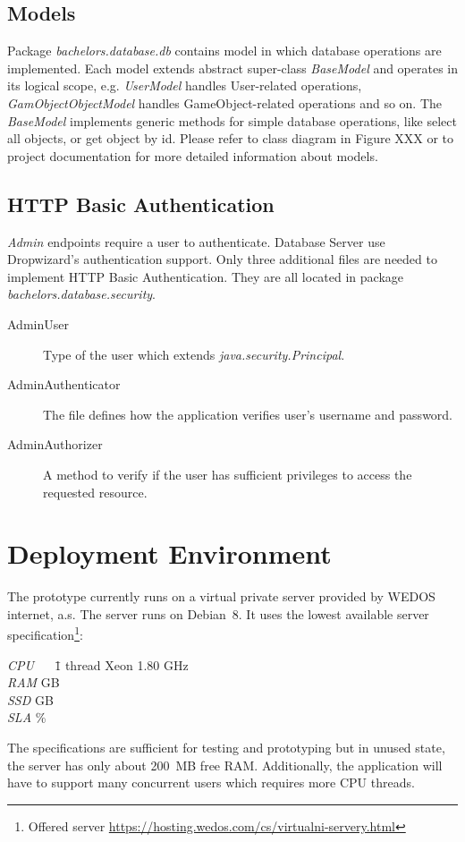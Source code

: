 \subsection{Models}
Package \textit{bachelors.database.db} contains model in which database operations are implemented. Each model extends abstract super-class \textit{BaseModel} and operates in its logical scope, e.g. \textit{UserModel} handles User-related operations, \textit{GamObjectObjectModel} handles GameObject-related operations and so on. The \textit{BaseModel} implements generic methods for simple database operations, like select all objects, or get object by id. Please refer to class diagram in Figure XXX or to project documentation for more detailed information about models.

\subsection{HTTP Basic Authentication} 
\textit{Admin} endpoints require a user to authenticate. Database Server use Dropwizard's authentication support. Only three additional files are needed to implement HTTP Basic Authentication. They are all located in package \textit{bachelors.database.security}. 
\begin{description}
	\item[AdminUser] Type of the user which extends \textit{java.security.Principal}.
	\item[AdminAuthenticator] The file defines how the application verifies user's username and password.
	\item[AdminAuthorizer] A method to verify if the user has sufficient privileges to access the requested resource.
\end{description}

\section{Deployment Environment}
\label{section:deploy}
The prototype currently runs on a virtual private server provided by WEDOS internet, a.s. The server runs on Debian~8. It uses the lowest available server specification\footnote{Offered server \url{https://hosting.wedos.com/cs/virtualni-servery.html}}:
\begin{tabbing}
	\textit{CPU} ~~ \= 1 thread Xeon 1.80 GHz\\
	\textit{RAM}  GB\\
	\textit{SSD}  GB\\
	\textit{SLA} \%
\end{tabbing}

The specifications are sufficient for testing and prototyping but in unused state, the server has only about 200~MB free RAM. Additionally, the application will have to support many concurrent users which requires more CPU threads.  